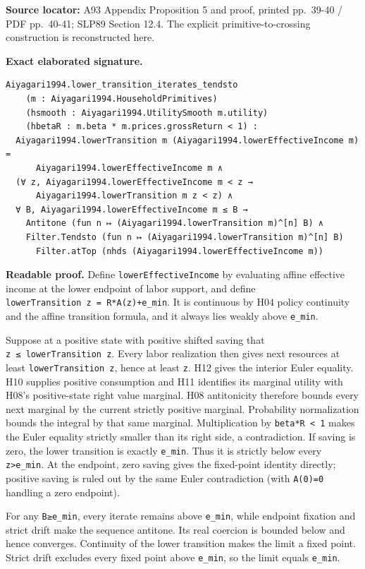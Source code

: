 \documentclass[
  11pt,
]{article}
\let\LedgerOriginalTexttt\texttt
\renewcommand{\texttt}[1]{{\small\LedgerOriginalTexttt{#1}}}
\begin{document}
\textbf{Source locator:} A93 Appendix Proposition 5 and proof, printed
pp.~39-40 / PDF pp.~40-41; SLP89 Section 12.4. The explicit
primitive-to-crossing construction is reconstructed here.

\textbf{Exact elaborated signature.}

\begin{verbatim}
Aiyagari1994.lower_transition_iterates_tendsto
    (m : Aiyagari1994.HouseholdPrimitives)
    (hsmooth : Aiyagari1994.UtilitySmooth m.utility)
    (hbetaR : m.beta * m.prices.grossReturn < 1) :
  Aiyagari1994.lowerTransition m (Aiyagari1994.lowerEffectiveIncome m) =
      Aiyagari1994.lowerEffectiveIncome m ∧
  (∀ z, Aiyagari1994.lowerEffectiveIncome m < z →
      Aiyagari1994.lowerTransition m z < z) ∧
  ∀ B, Aiyagari1994.lowerEffectiveIncome m ≤ B →
    Antitone (fun n ↦ (Aiyagari1994.lowerTransition m)^[n] B) ∧
    Filter.Tendsto (fun n ↦ (Aiyagari1994.lowerTransition m)^[n] B)
      Filter.atTop (nhds (Aiyagari1994.lowerEffectiveIncome m))
\end{verbatim}

\textbf{Readable proof.} Define \texttt{lowerEffectiveIncome} by
evaluating affine effective income at the lower endpoint of labor
support, and define \texttt{lowerTransition\ z\ =\ R*A(z)+e\_min}. It is
continuous by H04 policy continuity and the affine transition formula,
and it always lies weakly above \texttt{e\_min}.

Suppose at a positive state with positive shifted saving that
\texttt{z\ ≤\ lowerTransition\ z}. Every labor realization then gives
next resources at least \texttt{lowerTransition\ z}, hence at least
\texttt{z}. H12 gives the interior Euler equality. H10 supplies positive
consumption and H11 identifies its marginal utility with H08's
positive-state right value marginal. H08 antitonicity therefore bounds
every next marginal by the current strictly positive marginal.
Probability normalization bounds the integral by that same marginal.
Multiplication by \texttt{beta*R\ \textless{}\ 1} makes the Euler
equality strictly smaller than its right side, a contradiction. If
saving is zero, the lower transition is exactly \texttt{e\_min}. Thus it
is strictly below every \texttt{z\textgreater{}e\_min}. At the endpoint,
zero saving gives the fixed-point identity directly; positive saving is
ruled out by the same Euler contradiction (with \texttt{A(0)=0} handling
a zero endpoint).

For any \texttt{B≥e\_min}, every iterate remains above \texttt{e\_min},
while endpoint fixation and strict drift make the sequence antitone. Its
real coercion is bounded below and hence converges. Continuity of the
lower transition makes the limit a fixed point. Strict drift excludes
every fixed point above \texttt{e\_min}, so the limit equals
\texttt{e\_min}.
\end{document}
